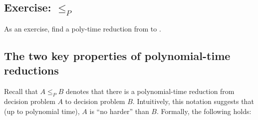 \subsection{Exercise:  $\le_P$ }

As an exercise, find a poly-time reduction from  to .

\subsection{The two key properties of polynomial-time reductions}\label{flow: sec: key properties of reductions}
Recall that $A \le_P B$ denotes that
there is a polynomial-time reduction from decision problem $A$
to decision problem $B$.
Intuitively, this notation suggests that (up to polynomial time),
$A$ is ``no harder'' than $B$.
Formally, the following holds:

